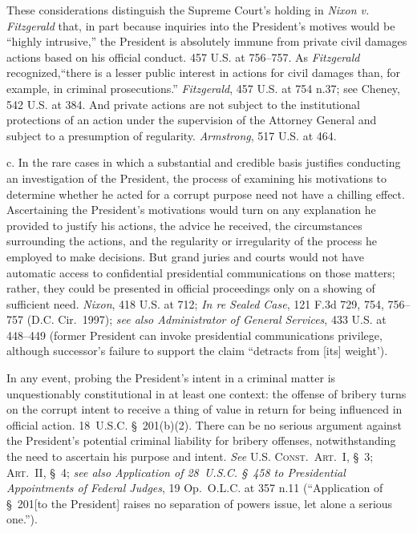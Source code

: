 These considerations distinguish the Supreme Court's holding in \textit{Nixon v. Fitzgerald} that, in part because inquiries into the President's motives would be ``highly intrusive,'' the President is absolutely immune from private civil damages actions based on his official conduct. 457 U.S. at 756--757.
As \textit{Fitzgerald} recognized,``there is a lesser public interest in actions for civil damages than, for example, in criminal prosecutions.''
\textit{Fitzgerald}, 457 U.S. at 754 n.37; see Cheney, 542 U.S. at 384.
And private actions are not subject to the institutional protections of an action under the supervision of the Attorney General and subject to a presumption of regularity.
\textit{Armstrong}, 517 U.S. at 464.

c. In the rare cases in which a substantial and credible basis justifies conducting an investigation of the President, the process of examining his motivations to determine whether he acted for a corrupt purpose need not have a chilling effect.
Ascertaining the President's motivations would turn on any explanation he provided to justify his actions, the advice he received, the circumstances surrounding the actions, and the regularity or irregularity of the process he employed to make decisions.
But grand juries and courts would not have automatic access to confidential presidential communications on those matters; rather, they could be presented in official proceedings only on a showing of sufficient need.
\textit{Nixon}, 418 U.S. at 712;
\textit{In re Sealed Case}, 121 F.3d 729, 754, 756--757 (D.C. Cir.~1997);
\textit{see also Administrator of General Services}, 433 U.S. at 448--449 (former President can invoke presidential communications privilege, although successor's failure to support the claim ``detracts from [its] weight').

In any event, probing the President's intent in a criminal matter is unquestionably constitutional in at least one context: the offense of bribery turns on the corrupt intent to receive a thing of value in return for being influenced in official action.
18~U.S.C. \S~201(b)(2).
There can be no serious argument against the President's potential criminal liability for bribery offenses, notwithstanding the need to ascertain his purpose and intent.
\textit{See} \textsc{U.S. Const.\ Art.~I}, \S~3; \textsc{Art.~II}, \S~4;
\textit{see also Application of 28~U.S.C. \S~458 to Presidential Appointments of Federal Judges}, 19 Op.\ O.L.C. at 357 n.11 (``Application of \S~201[to the President] raises no separation of powers issue, let alone a serious one.'').

